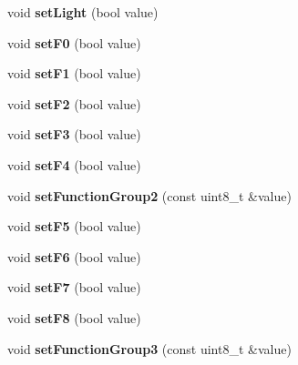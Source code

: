 \begin{DoxyCompactItemize}
void {\bfseries set\+Light} (bool value)
\item 
\mbox{\label{classTBT_1_1LocDecoder_ae7dc2a2221ba08ecaf34f50636f59b54}} 
void {\bfseries set\+F0} (bool value)
\item 
\mbox{\label{classTBT_1_1LocDecoder_aba76c6a9b002224297ba04ded570eee4}} 
void {\bfseries set\+F1} (bool value)
\item 
\mbox{\label{classTBT_1_1LocDecoder_a60e4822d5d730abec02cf045353d5316}} 
void {\bfseries set\+F2} (bool value)
\item 
\mbox{\label{classTBT_1_1LocDecoder_a6316b9510a9f3552dae834bb6c3deebc}} 
void {\bfseries set\+F3} (bool value)
\item 
\mbox{\label{classTBT_1_1LocDecoder_ae37228489df216238a51e1a22c37d66c}} 
void {\bfseries set\+F4} (bool value)
\item 
\mbox{\label{classTBT_1_1LocDecoder_af021433df427aac432590da7be6393a8}} 
void {\bfseries set\+Function\+Group2} (const uint8\+\_\+t \&value)
\item 
\mbox{\label{classTBT_1_1LocDecoder_a4e548e580a6ec3c93369af591281e00f}} 
void {\bfseries set\+F5} (bool value)
\item 
\mbox{\label{classTBT_1_1LocDecoder_af971c14a9437b240d17ab4ca9ffb3e67}} 
void {\bfseries set\+F6} (bool value)
\item 
\mbox{\label{classTBT_1_1LocDecoder_a16a3659cd9a64be4b6ef43b499004434}} 
void {\bfseries set\+F7} (bool value)
\item 
\mbox{\label{classTBT_1_1LocDecoder_a6a65d02e101d91142ce48587c9c905cf}} 
void {\bfseries set\+F8} (bool value)
\item 
\mbox{\label{classTBT_1_1LocDecoder_a81f9805d0a984a94dab529602ef9ae64}} 
void {\bfseries set\+Function\+Group3} (const uint8\+\_\+t \&value)

\end{DoxyCompactItemize}
